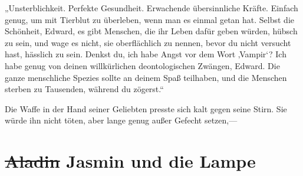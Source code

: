„Unsterblichkeit. Perfekte Gesundheit. Erwachende übersinnliche Kräfte. Einfach genug, um mit Tierblut zu überleben, wenn man es einmal getan hat. Selbst die Schönheit, Edward, es gibt Menschen, die ihr Leben dafür geben würden, hübsch zu sein, und wage es nicht, sie oberflächlich zu nennen, bevor du nicht versucht hast, hässlich zu sein. Denkst du, ich habe Angst vor dem Wort ‚Vampir‘? Ich habe genug von deinen willkürlichen deontologischen Zwängen, Edward. Die ganze menschliche Spezies sollte an deinem Spaß teilhaben, und die Menschen sterben zu Tausenden, während du zögerst.“

Die Waffe in der Hand seiner Geliebten presste sich kalt gegen seine Stirn. Sie würde ihn nicht töten, aber lange genug außer Gefecht setzen,—

\section{\sout{Aladin} Jasmin und die Lampe}

